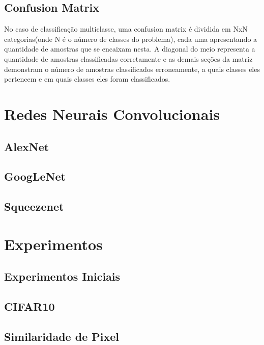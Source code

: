 \documentclass[conference]{IEEEtran}
\begin{document}
\subsection{Confusion Matrix}
No caso de classificação multiclasse, uma confusion matrix é dividida em NxN categorias(onde N é o número de classes do problema), cada uma apresentando a quantidade de amostras que se encaixam nesta.
A diagonal do meio representa a quantidade de amostras classificadas corretamente e as demais seções da matriz demonstram o número de amostras classificados erroneamente, a quais classes eles pertencem e em quais classes eles foram classificados.

\cite{metrics}




\section{Redes Neurais Convolucionais}


\subsection{AlexNet}

\subsection{GoogLeNet}

\subsection{Squeezenet}


\section{Experimentos}

\subsection{Experimentos Iniciais}

\subsection{CIFAR10}


\subsection{Similaridade de Pixel}
\end{document}
